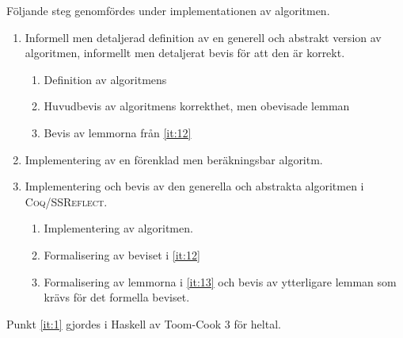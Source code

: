 Följande steg genomfördes under implementationen av algoritmen.
\begin{enumerate}
  \item Informell men detaljerad definition av en generell och abstrakt version
    av algoritmen, informellt men detaljerat bevis för att den är korrekt.
    \label{it:1}
    \begin{enumerate}
      \item Definition av algoritmens
      \item Huvudbevis av algoritmens korrekthet, men obevisade lemman \label{it:12}
      \item Bevis av lemmorna från \ref{it:12} \label{it:13}
    \end{enumerate}
  \item Implementering av en förenklad men beräkningsbar algoritm. \label{it:2}
  \item Implementering och bevis av den generella och abstrakta algoritmen i
    \textsc{Coq/SSReflect}.\label{it:3}
    \begin{enumerate}
      \item Implementering av algoritmen.
      \item Formalisering av beviset i \ref{it:12}
      \item Formalisering av lemmorna i \ref{it:13} och bevis av ytterligare
        lemman som krävs för det formella beviset.
    \end{enumerate}
\end{enumerate}
Punkt \ref{it:1} gjordes i Haskell av Toom-Cook 3 för heltal.
